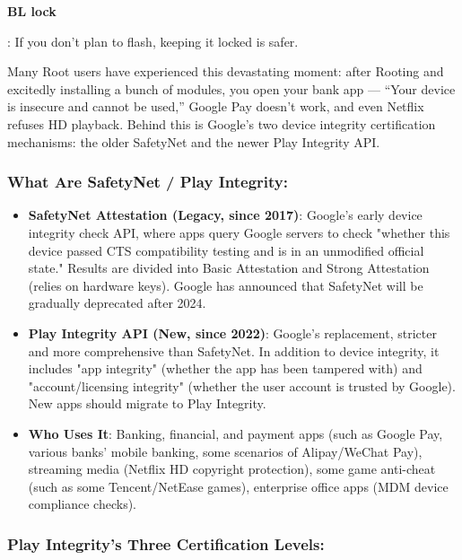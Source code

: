 \textbf{BL lock}\par

: If you don't plan to flash, keeping it locked is safer.


Many Root users have experienced this devastating moment: after Rooting and excitedly installing a bunch of modules, you open your bank app — “Your device is insecure and cannot be used,” Google Pay doesn't work, and even Netflix refuses HD playback. Behind this is Google's two device integrity certification mechanisms: the older SafetyNet and the newer Play Integrity API.

\subsubsection*{What Are SafetyNet / Play Integrity:}

\begin{itemize}
  \item \textbf{SafetyNet Attestation (Legacy, since 2017)}: Google's early device integrity check API, where apps query Google servers to check "whether this device passed CTS compatibility testing and is in an unmodified official state." Results are divided into Basic Attestation and Strong Attestation (relies on hardware keys). Google has announced that SafetyNet will be gradually deprecated after 2024.
  \item \textbf{Play Integrity API (New, since 2022)}: Google's replacement, stricter and more comprehensive than SafetyNet. In addition to device integrity, it includes "app integrity" (whether the app has been tampered with) and "account/licensing integrity" (whether the user account is trusted by Google). New apps should migrate to Play Integrity.
  \item \textbf{Who Uses It}: Banking, financial, and payment apps (such as Google Pay, various banks' mobile banking, some scenarios of Alipay/WeChat Pay), streaming media (Netflix HD copyright protection), some game anti-cheat (such as some Tencent/NetEase games), enterprise office apps (MDM device compliance checks).
\end{itemize}

\subsubsection*{Play Integrity's Three Certification Levels:}

